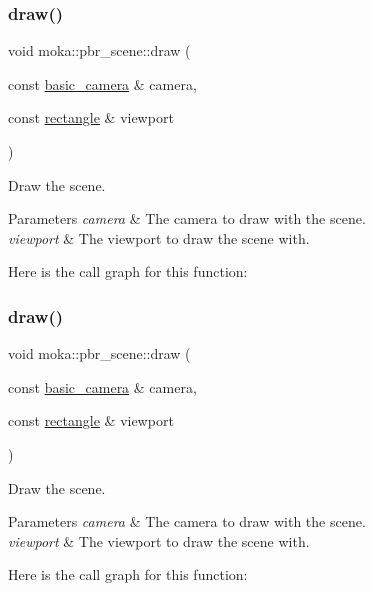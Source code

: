 \subsubsection{\texorpdfstring{draw()}{draw()}\hspace{0.1cm}{\footnotesize\ttfamily [1/2]}}
{\footnotesize\ttfamily void moka\+::pbr\+\_\+scene\+::draw (\begin{DoxyParamCaption}\item[{const \mbox{\hyperlink{classmoka_1_1basic__camera}{basic\+\_\+camera}} \&}]{camera,  }\item[{const \mbox{\hyperlink{namespacemoka_ab5e90635f0a0441cc99f2328bc34500d}{rectangle}} \&}]{viewport }\end{DoxyParamCaption})\hspace{0.3cm}{\ttfamily [inline]}}



Draw the scene. 


\begin{DoxyParams}{Parameters}
{\em camera} & The camera to draw with the scene. \\
\hline
{\em viewport} & The viewport to draw the scene with. \\
\hline
\end{DoxyParams}
Here is the call graph for this function\+:
\mbox{\label{classmoka_1_1pbr__scene_a520722e6fd897bd9d35cd5c1b6eb14b6}} 
\subsubsection{\texorpdfstring{draw()}{draw()}\hspace{0.1cm}{\footnotesize\ttfamily [2/2]}}
{\footnotesize\ttfamily void moka\+::pbr\+\_\+scene\+::draw (\begin{DoxyParamCaption}\item[{const \mbox{\hyperlink{classmoka_1_1basic__camera}{basic\+\_\+camera}} \&}]{camera,  }\item[{const \mbox{\hyperlink{namespacemoka_ab5e90635f0a0441cc99f2328bc34500d}{rectangle}} \&}]{viewport }\end{DoxyParamCaption})\hspace{0.3cm}{\ttfamily [inline]}}



Draw the scene. 


\begin{DoxyParams}{Parameters}
{\em camera} & The camera to draw with the scene. \\
\hline
{\em viewport} & The viewport to draw the scene with. \\
\hline
\end{DoxyParams}
Here is the call graph for this function\+:


